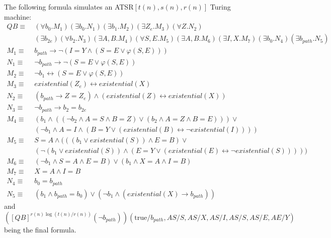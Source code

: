 The following formula simulates an ATSR$[t(n), s(n), r(n)]$ Turing machine:
\[
    \begin{aligned}
        QB \equiv&~(\forall b_{0}.M_{1})(\exists b_{0}.N_{1})(\exists b_{1}.M_{2})(\exists Z_{e}.M_{3})(\forall Z.N_{2})\\
        &~(\exists b_{2e})(\forall b_{2}.N_{3})(\exists A, B.M_{4})(\forall S, E.M_{5})(\exists A, B.M_{6})(\exists I, X.M_{7})(\exists b_{0}.N_{4})(\exists b_{path}.N_{5}) \\
        M_{1} \equiv&~b_{path} \to \neg(I = Y \land (S = E \lor \varphi(S, E))) \\
        N_{1} \equiv&~\neg b_{path} \to \neg(S = E \lor \varphi(S, E)) \\
        M_{2} \equiv&~\neg b_{1} \leftrightarrow (S = E \lor \varphi(S, E)) \\
        M_{3} \equiv&~existential(Z_{e}) \leftrightarrow existential(X)\\
        N_{2} \equiv&~(b_{path} \to Z = Z_{e}) \land (existential(Z) \leftrightarrow existential(X))\\
        N_{3} \equiv&~ \neg b_{path} \to b_{2} = b_{2e}\\
        M_{4} \equiv&~(b_{1} \land ((\neg b_{2} \land A = S  \land B = Z) \lor (b_{2} \land A = Z \land B = E))) \lor \\
        &~(\neg b_{1} \land  A = I \land (B = Y \lor (existential(B) \leftrightarrow \neg existential(I)))) \\
        M_{5} \equiv&~S = A \land ((( b_{1} \lor existential(S)) \land E = B) \lor \\
        &~(\neg( b_{1} \lor existential(S)) \land (E = Y \lor (existential(E)\leftrightarrow \neg existential(S))))) \\
        M_{6} \equiv&~(\neg b_{1}  \land S = A \land E = B) \lor (b_{1} \land X = A \land I = B)\\
        M_{7} \equiv&~X = A \land I = B \\
        N_{4} \equiv&~b_{0} = b_{path} \\
        N_{5} \equiv&~(b_{1} \land b_{path} = b_{0}) \lor (\neg b_{1} \land (existential(X) \to b_{path}))
    \end{aligned}
\]
and $\left([QB]^{r(n)\log(t(n)/r(n))}(\neg b_{path})\right)(\text{true} / b_{path}, AS / S, AS / X, AS /I, AS /S, AS / E, AE / Y)$ being the final formula.

